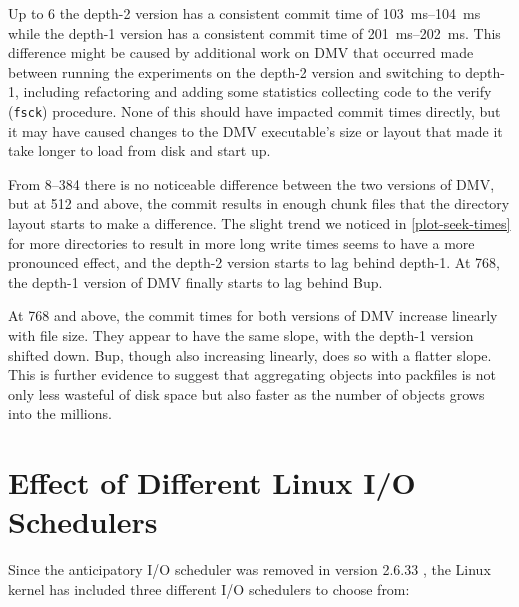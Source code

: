 Up to \SI{6}{\mib} the depth-\num{2} version has a consistent commit time of
\SIrange{103}{104}{\ms} while the depth-\num{1} version has a consistent commit
time of \SIrange{201}{202}{\ms}. This difference might be caused by additional
work on DMV that occurred made between running the experiments on the
depth-\num{2} version and switching to depth-\num{1}, including refactoring and
adding some statistics collecting code to the verify (\lstinline{fsck})
procedure. None of this should have impacted commit times directly, but it may
have caused changes to the DMV executable's size or layout that made it take
longer to load from disk and start up.

From \SIrange{8}{384}{\mib} there is no noticeable difference between the two
versions of DMV, but at \SI{512}{\mib} and above, the commit results in enough
chunk files that the directory layout starts to make a difference. The slight
trend we noticed in \autoref{plot-seek-times} for more directories to result in
more long write times seems to have a more pronounced effect, and the
depth-\num{2} version starts to lag behind depth-\num{1}. At \SI{768}{\mib}, the
depth-\num{1} version of DMV finally starts to lag behind Bup.

At \SI{768}{\mib} and above, the commit times for both versions of DMV increase
linearly with file size. They appear to have the same slope, with the
depth-\num{1} version shifted down. Bup, though also increasing linearly, does
so with a flatter slope. This is further evidence to suggest that aggregating
objects into \glspl{packfile} is not only less wasteful of disk space but also
faster as the number of objects grows into the millions.

%



\section{Effect of Different Linux I/O Schedulers}

Since the anticipatory I/O scheduler was removed in version 2.6.33
\cite{as_removed_linux_release_notes}, the Linux kernel has included three
different I/O schedulers to choose from\cite{ioschedulers}:

